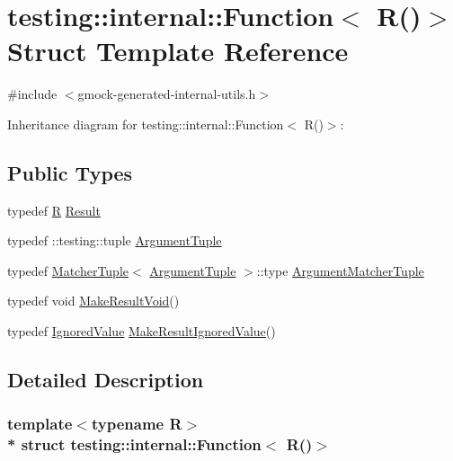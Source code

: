 \hypertarget{structtesting_1_1internal_1_1_function_3_01_r_07_08_4}{}\section{testing\+:\+:internal\+:\+:Function$<$ R()$>$ Struct Template Reference}
\label{structtesting_1_1internal_1_1_function_3_01_r_07_08_4}


{\ttfamily \#include $<$gmock-\/generated-\/internal-\/utils.\+h$>$}



Inheritance diagram for testing\+:\+:internal\+:\+:Function$<$ R()$>$\+:
\subsection*{Public Types}
\begin{DoxyCompactItemize}
\item 
typedef \hyperlink{typedefs__9_8js_afb423b73ee7b6c04d2d54fc06e405404}{R} \hyperlink{structtesting_1_1internal_1_1_function_3_01_r_07_08_4_a5c228a886ef598ac10988f8de5e32ca1}{Result}
\item 
typedef \+::testing\+::tuple \hyperlink{structtesting_1_1internal_1_1_function_3_01_r_07_08_4_ad483c3128c470d8cdb55c3ac1c575c11}{Argument\+Tuple}
\item 
typedef \hyperlink{structtesting_1_1internal_1_1_matcher_tuple}{Matcher\+Tuple}$<$ \hyperlink{structtesting_1_1internal_1_1_function_3_01_r_07_08_4_ad483c3128c470d8cdb55c3ac1c575c11}{Argument\+Tuple} $>$\+::type \hyperlink{structtesting_1_1internal_1_1_function_3_01_r_07_08_4_a9bec5cf8937e8af99dedab2f40129fab}{Argument\+Matcher\+Tuple}
\item 
typedef void \hyperlink{structtesting_1_1internal_1_1_function_3_01_r_07_08_4_a666b5ad3bf155529d3a0f9fe6d5c897b}{Make\+Result\+Void}()
\item 
typedef \hyperlink{classtesting_1_1internal_1_1_ignored_value}{Ignored\+Value} \hyperlink{structtesting_1_1internal_1_1_function_3_01_r_07_08_4_aa459093a5b52ef54e2544b5a6c054383}{Make\+Result\+Ignored\+Value}()
\end{DoxyCompactItemize}


\subsection{Detailed Description}
\subsubsection*{template$<$typename R$>$\\*
struct testing\+::internal\+::\+Function$<$ R()$>$}



